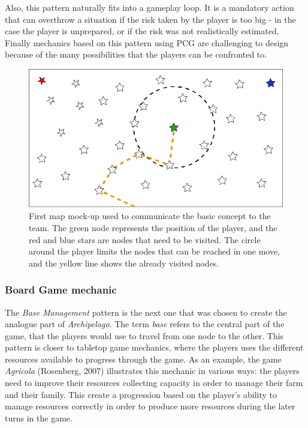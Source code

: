 Also, this pattern naturally fits into a gameplay loop. It is a mandatory action that can overthrow a situation if the risk taken by the player is too big - in the case the player is unprepared, or if the risk was not realistically estimated. Finally mechanics based on this pattern using PCG are challenging to design because of the many possibilities that the players can be confronted to. 
\begin{figure}[h]
    \centering
    \includegraphics[scale=0.25]{Images/Map.png}
    \caption{First map mock-up used to communicate the basic concept to the team. The green node represents the position of the player, and the red and blue stars are nodes that need to be visited. The circle around the player limits the nodes that can be reached in one move, and the yellow line shows the already visited nodes.}
    \label{fig:map}
\end{figure}
\subsubsection{Board Game mechanic}
The \textit{Base Management} pattern is the next one that was chosen to create the analogue part of \textit{Archipelago}. The term \textit{base} refers to the central part of the game, that the players would use to travel from one node to the other. This pattern is closer to tabletop game mechanics, where the players uses the different resources available to progress through the game. As an example, the game \textit{Agricola} (Rosenberg, 2007) \cite{game:agri} illustrates this mechanic in various ways: the players need to improve their resources collecting capacity in order to manage their farm and their family. This create a progression based on the player's ability to manage resources correctly in order to produce more resources during the later turns in the game.

